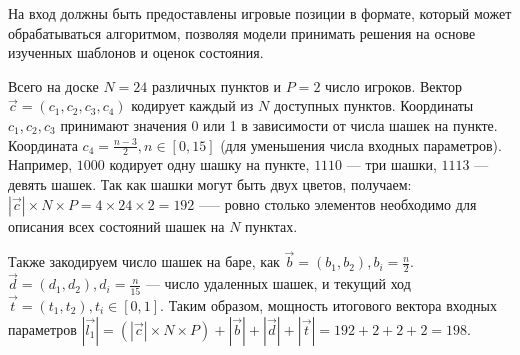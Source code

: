 На вход должны быть предоставлены игровые позиции в формате, который может обрабатываться алгоритмом, позволяя модели принимать решения на основе изученных шаблонов и оценок состояния.

Всего на доске $N = 24$ различных пунктов и $P = 2$ число игроков. Вектор $\vec{c} = (c_1, c_2, c_3, c_4)$ кодирует каждый из $N$ доступных пунктов. Координаты $c_1, c_2, c_3$ принимают значения 0 или 1 в зависимости от числа шашек на пункте. Координата $c_4 = \frac{n - 3}{2}, n \in [0, 15]$ (для уменьшения числа входных параметров). Например, $1000$ кодирует одну шашку на пункте, $1110$ --- три шашки, $1113$ --- девять шашек. Так как шашки могут быть двух цветов, получаем: $|\vec{c}| \times N \times P = 4 \times 24 \times 2 = 192$ —-- ровно столько элементов необходимо для описания всех состояний шашек на $N$ пунктах.

Также закодируем число шашек на баре, как $\vec{b} = (b_1, b_2), b_i = \frac{n}{2}$. $\vec{d} = (d_1, d_2),  d_i = \frac{n}{15}$ --- число удаленных шашек, и текущий ход $\vec{t} = (t_1, t_2), t_i \in [0, 1]$. Таким образом, мощность итогового вектора входных параметров $|\vec{l_1}| = (|\vec{c}| \times N \times P) + |\vec{b}| + |\vec{d}| + |\vec{t}| = 192 + 2 + 2 + 2 = 198$.
